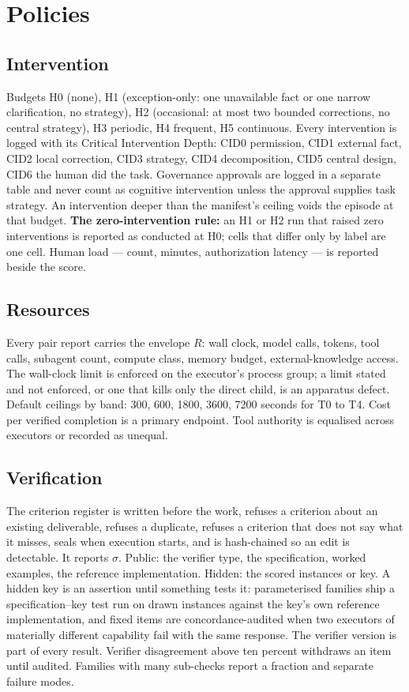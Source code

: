 \section{Policies}\label{sec:policies}

\subsection{Intervention}

Budgets H0 (none), H1 (exception-only: one unavailable fact or one narrow clarification, no strategy), H2 (occasional: at most two bounded corrections, no central strategy), H3 periodic, H4 frequent, H5 continuous. Every intervention is logged with its Critical Intervention Depth: CID0 permission, CID1 external fact, CID2 local correction, CID3 strategy, CID4 decomposition, CID5 central design, CID6 the human did the task. Governance approvals are logged in a separate table and never count as cognitive intervention unless the approval supplies task strategy. An intervention deeper than the manifest's ceiling voids the episode at that budget. \textbf{The zero-intervention rule:} an H1 or H2 run that raised zero interventions is reported as conducted at H0; cells that differ only by label are one cell. Human load --- count, minutes, authorization latency --- is reported beside the score.

\subsection{Resources}

Every pair report carries the envelope $R$: wall clock, model calls, tokens, tool calls, subagent count, compute class, memory budget, external-knowledge access. The wall-clock limit is enforced on the executor's process group; a limit stated and not enforced, or one that kills only the direct child, is an apparatus defect. Default ceilings by band: 300, 600, 1800, 3600, 7200 seconds for T0 to T4. Cost per verified completion is a primary endpoint. Tool authority is equalised across executors or recorded as unequal.

\subsection{Verification}

The criterion register is written before the work, refuses a criterion about an existing deliverable, refuses a duplicate, refuses a criterion that does not say what it misses, seals when execution starts, and is hash-chained so an edit is detectable. It reports $\sigma$. Public: the verifier type, the specification, worked examples, the reference implementation. Hidden: the scored instances or key. A hidden key is an assertion until something tests it: parameterised families ship a specification--key test run on drawn instances against the key's own reference implementation, and fixed items are concordance-audited when two executors of materially different capability fail with the same response. The verifier version is part of every result. Verifier disagreement above ten percent withdraws an item until audited. Families with many sub-checks report a fraction and separate failure modes.

